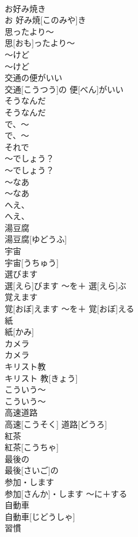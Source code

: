 \documentclass[8pt]{extreport}
\begin{document}
\begin{CJK}{UTF8}{min}
\\	お好み焼き	
\\	お 好み焼[このみや]き		
\\	思ったより〜	
\\	思[おも]ったより〜		
\\	〜けど	
\\	〜けど		
\\	交通の便がいい	
\\	交通[こうつう]の 便[べん]がいい		
\\	そうなんだ	
\\	そうなんだ		
\\	で、〜	
\\	で、〜	
\\	それで 
\\	〜でしょう？	
\\	〜でしょう？		
\\	〜なあ	
\\	〜なあ		
\\	へえ、	
\\	へえ、		
\\	湯豆腐	
\\	湯豆腐[ゆどうふ]		
\\	宇宙	
\\	宇宙[うちゅう]		
\\	選びます	
\\	選[えら]びます	〜を＋ 選[えら]ぶ	
\\	覚えます	
\\	覚[おぼ]えます	〜を＋ 覚[おぼ]える	
\\	紙	
\\	紙[かみ]		
\\	カメラ	
\\	カメラ		
\\	キリスト教	
\\	キリスト 教[きょう]		
\\	こういう〜	
\\	こういう〜		
\\	高速道路	
\\	高速[こうそく] 道路[どうろ]		
\\	紅茶	
\\	紅茶[こうちゃ]		
\\	最後の	
\\	最後[さいご]の		
\\	参加・します	
\\	参加[さんか]・します	〜に＋する	
\\	自動車	
\\	自動車[じどうしゃ]		
\\	習慣	

\end{CJK}
\end{document}
